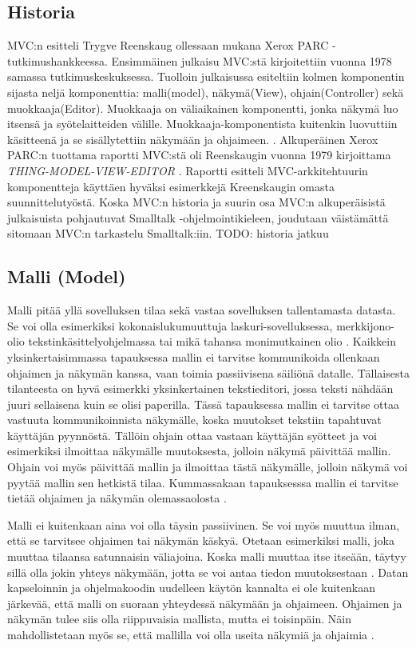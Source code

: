 \documentclass[finnish,utf8,nonumbib,palatino,kandi]{gradu2}
\begin{document}
\subsection{Historia}

MVC:n esitteli Trygve Reenskaug ollessaan mukana Xerox PARC -tutkimushankkeessa. Ensimmäinen julkaisu MVC:stä
kirjoitettiin vuonna 1978 samassa tutkimuskeskuksessa. Tuolloin julkaisussa esiteltiin kolmen komponentin sijasta neljä
komponenttia: malli(model), näkymä(View), ohjain(Controller) sekä muokkaaja(Editor). Muokkaaja on väliaikainen komponentti, jonka näkymä
luo itsensä ja syötelaitteiden välille. Muokkaaja-komponentista kuitenkin luovuttiin käsitteenä ja se sisällytettiin näkymään ja ohjaimeen. \cite{Reenskaug}.
Alkuperäinen Xerox PARC:n tuottama raportti MVC:stä oli Reenskaugin vuonna 1979 kirjoittama \emph{THING-MODEL-VIEW-EDITOR} \cite{Reenskaug:1979}. Raportti
esitteli MVC-arkkitehtuurin komponentteja käyttäen hyväksi esimerkkejä Kreenskaugin omasta suunnittelutyöstä. Koska MVC:n historia ja suurin osa MVC:n
alkuperäisistä julkaisuista pohjautuvat Smalltalk -ohjelmointikieleen, joudutaan väistämättä sitomaan MVC:n tarkastelu Smalltalk:iin.  TODO: historia jatkuu

\subsection{Malli (Model)}
Malli pitää yllä sovelluksen tilaa sekä vastaa sovelluksen tallentamasta datasta. Se voi olla esimerkiksi kokonaislukumuuttuja laskuri-sovelluksessa, merkkijono-olio tekstinkäsittelyohjelmassa tai
mikä tahansa monimutkainen olio \cite[s. 3]{Krasner:desc}. Kaikkein yksinkertaisimmassa tapauksessa mallin ei tarvitse kommunikoida ollenkaan ohjaimen ja näkymän kanssa, vaan toimia passiivisena säiliönä datalle.
Tällaisesta tilanteesta on hyvä esimerkki yksinkertainen tekstieditori, jossa teksti nähdään juuri sellaisena kuin se olisi paperilla. Tässä tapauksessa mallin ei tarvitse ottaa vastuuta
kommunikoinnista näkymälle, koska muutokset tekstiin tapahtuvat käyttäjän pyynnöstä. Tällöin ohjain ottaa vastaan käyttäjän syötteet ja voi esimerkiksi ilmoittaa näkymälle muutoksesta, jolloin näkymä
päivittää mallin. Ohjain voi myös päivittää mallin ja ilmoittaa tästä näkymälle, jolloin näkymä voi pyytää mallin sen hetkistä tilaa. Kummassakaan tapauksesssa mallin ei tarvitse tietää ohjaimen ja näkymän
olemassaolosta \cite{Burbeck}.

Malli ei kuitenkaan aina voi olla täysin passiivinen. Se voi myös muuttua ilman, että se tarvitsee ohjaimen tai näkymän käskyä. Otetaan esimerkiksi malli, joka muuttaa tilaansa satunnaisin väliajoina. Koska malli muuttaa itse itseään, täytyy sillä olla jokin yhteys näkymään, jotta se voi antaa tiedon muutoksestaan \cite{Burbeck}. Datan kapseloinnin ja ohjelmakoodin uudelleen käytön kannalta ei ole kuitenkaan järkevää, että malli on suoraan yhteydessä näkymään ja ohjaimeen. Ohjaimen ja näkymän tulee siis olla riippuvaisia mallista, mutta ei toisinpäin. Näin mahdollistetaan myös se, että mallilla voi olla useita näkymiä ja ohjaimia \cite[s. 4]{Krasner:desc}.
\end{document}
